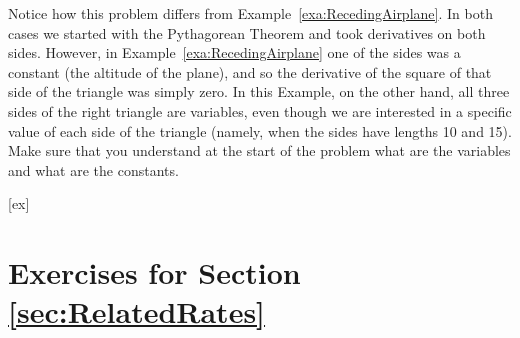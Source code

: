 Notice how this problem differs from
Example~\ref{exa:RecedingAirplane}.  In both cases we started with the
Pythagorean Theorem and took derivatives on both sides.  However, in
Example~\ref{exa:RecedingAirplane} one of the sides was a constant
(the altitude of the plane), and so the derivative of the square of
that side of the triangle was simply zero.  In this Example, on the
other hand, all three sides of the right triangle are variables, even
though we are interested in a specific value of each side of the
triangle (namely, when the sides have lengths 10 and 15). Make sure
that you understand at the start of the problem what are the variables
and what are the constants.


[ex]
\section*{Exercises for Section \ref{sec:RelatedRates}}

